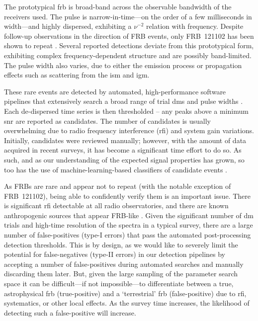 \documentclass[a4paper,fleqn,usenatbib]{mnras}
\begin{document}
The prototypical \gls{frb} is broad-band across the observable bandwidth of the
receivers used. The pulse is narrow-in-time---on the order of a few milliseconds
in width---and highly dispersed, exhibiting a $\nu^{-2}$ relation with
frequency.  Despite follow-up observations in the direction of FRB events, only
FRB~121102 has been shown to repeat \citep{2016Natur.531..202S}. Several
reported detections deviate from this prototypical form, exhibiting complex
frequency-dependent structure and are possibly band-limited. The pulse width
also varies, due to either the emission process or propagation effects such as
scattering from the \gls{ism} and \gls{igm}.

These rare events are detected by automated, high-performance software pipelines
that extensively search a broad range of trial \glspl{dm} and pulse widths
\citep{Barsdell2012, 2015MNRAS.452.1254K, Bannister2017, Chime2018}. Each
de-dispersed time series is then thresholded -- any peaks above a minimum
\gls{snr} are reported as candidates. The number of candidates is usually
overwhelming due to radio frequency interference (\gls{rfi}) and system gain
variations. Initially, candidates were reviewed manually; however, with the
amount of data acquired in recent surveys, it has become a significant time
effort to do so. As such, and as our understanding of the expected signal
properties has grown, so too has the use of machine-learning-based classifiers
of candidate events \citep[e.g.][]{Wagstaff2016, 2018MNRAS.474.3847F, Farah2018,
Connor2018}.

As FRBs are rare and appear not to repeat (with the notable exception of
FRB~121102), being able to confidently verify them is an important issue. There
is significant \gls{rfi} detectable at all radio observatories, and there are
known anthropogenic sources that appear FRB-like \citep{2011ApJ...727...18B}.
Given the significant number of \gls{dm} trials and high-time resolution of the
spectra in a typical survey, there are a large number of false-positives (type-I
errors) that pass the automated post-processing detection thresholds.  This is
by design, as we would like to severely limit the potential for false-negatives
(type-II errors) in our detection pipelines by accepting a number of
false-positives during automated searches and manually discarding them later.
But, given the large sampling of the parameter search space it can be
difficult---if not impossible---to differentiate between a true, astrophysical
\gls{frb} (true-positive) and a `terrestrial' \gls{frb} (false-positive) due to
\gls{rfi}, systematics, or other local effects. As the survey time increases,
the likelihood of detecting such a false-positive will increase. 
\end{document}
